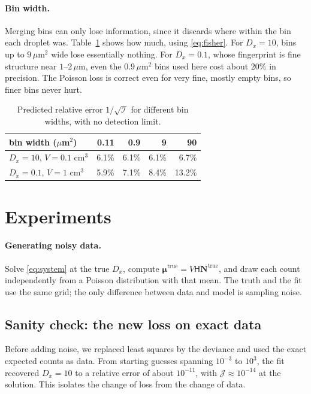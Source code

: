 \documentclass[11pt]{article}
\newcommand{\um}{\,\mu\mathrm{m}}
\newcommand{\J}{\mathcal{J}}
\newcommand{\Hm}{\mathsf{H}}
\newcommand{\N}{\mathbf{N}}
\newcommand{\bmu}{\bm{\mu}}
\begin{document}
\paragraph{Bin width.} Merging bins can only lose information, since it discards where within the bin each droplet was. Table~\ref{tab:binwidth} shows how much, using \eqref{eq:fisher}. For $D_x = 10$, bins up to $9\um^2$ wide lose essentially nothing. For $D_x = 0.1$, whose fingerprint is fine structure near $1$--$2\um$, even the $0.9\um^2$ bins used here cost about $20\%$ in precision. The Poisson loss is correct even for very fine, mostly empty bins, so finer bins never hurt.

\begin{table}[h]
\centering\small
\begin{tabular}{@{}lrrrr@{}}
\toprule
bin width ($\mu$m$^2$) & 0.11 & 0.9 & 9 & 90\\\midrule
$D_x = 10$, $V = 0.1$ cm$^3$ & 6.1\% & 6.1\% & 6.1\% & 6.7\%\\
$D_x = 0.1$, $V = 1$ cm$^3$ & 5.9\% & 7.1\% & 8.4\% & 13.2\%\\\bottomrule
\end{tabular}
\caption{Predicted relative error $1/\sqrt{\mathcal I}$ for different bin widths, with no detection limit.}\label{tab:binwidth}
\end{table}

\section{Experiments}\label{sec:experiments}
\paragraph{Generating noisy data.} Solve \eqref{eq:system} at the true $D_x$, compute $\bmu^{\mathrm{true}} = V\Hm\N^{\mathrm{true}}$, and draw each count independently from a Poisson distribution with that mean. The truth and the fit use the same grid; the only difference between data and model is sampling noise.

\subsection{Sanity check: the new loss on exact data}
Before adding noise, we replaced least squares by the deviance and used the exact expected counts as data. From starting guesses spanning $10^{-3}$ to $10^3$, the fit recovered $D_x = 10$ to a relative error of about $10^{-11}$, with $\J\approx10^{-14}$ at the solution. This isolates the change of loss from the change of data.
\end{document}
